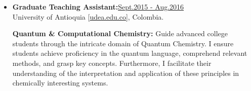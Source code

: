 \begin{itemize}
    \item {\bf Graduate Teaching Assistant:}\hfill \href{.}{Sept.2015 - Aug.2016}\\
          University of Antioquia [\href{www.udea.edu.co}{udea.edu.co}],
          Colombia.

              {\noindent
                  \textbf{Quantum \& Computational Chemistry:}
                  Guide advanced college students through the intricate domain of Quantum Chemistry. I ensure students achieve proficiency in the quantum language, comprehend relevant methods, and grasp key concepts. Furthermore, I facilitate their understanding of the interpretation and application of these principles in chemically interesting systems.
              }

\end{itemize}
